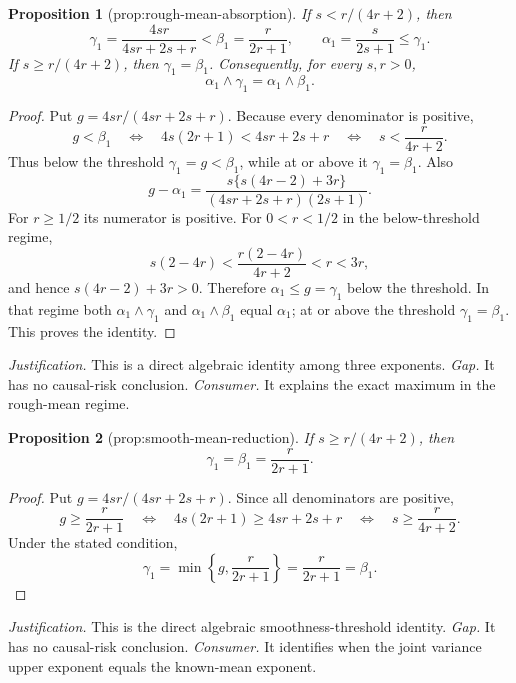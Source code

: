 \documentclass{article}
\newtheorem{proposition}{Proposition}
\begin{document}
\begin{proposition}[prop:rough-mean-absorption]\label{prop:rough-mean-absorption}
If \(s<r/(4r+2)\), then
\[
\gamma_1=\frac{4sr}{4sr+2s+r}<\beta_1=\frac{r}{2r+1},
\qquad
\alpha_1=\frac{s}{2s+1}\leq\gamma_1.
\]
If \(s\geq r/(4r+2)\), then \(\gamma_1=\beta_1\).  Consequently, for every \(s,r>0\),
\[
\alpha_1\wedge\gamma_1=\alpha_1\wedge\beta_1.
\]
\end{proposition}
\begin{proof}
Put \(g=4sr/(4sr+2s+r)\).  Because every denominator is positive,
\[
g<\beta_1
\quad\Longleftrightarrow\quad
4s(2r+1)<4sr+2s+r
\quad\Longleftrightarrow\quad
s<\frac{r}{4r+2}.
\]
Thus below the threshold \(\gamma_1=g<\beta_1\), while at or above it \(\gamma_1=\beta_1\).  Also
\[
g-\alpha_1
=\frac{s\{s(4r-2)+3r\}}
{(4sr+2s+r)(2s+1)}.
\]
For \(r\geq1/2\) its numerator is positive.  For \(0<r<1/2\) in the below-threshold regime,
\[
s(2-4r)<\frac{r(2-4r)}{4r+2}<r<3r,
\]
and hence \(s(4r-2)+3r>0\).  Therefore \(\alpha_1\leq g=\gamma_1\) below the threshold.  In that regime both \(\alpha_1\wedge\gamma_1\) and \(\alpha_1\wedge\beta_1\) equal \(\alpha_1\); at or above the threshold \(\gamma_1=\beta_1\).  This proves the identity.
\end{proof}
\par\smallskip\noindent \textit{Justification.} This is a direct algebraic identity among three exponents. \textit{Gap.} It has no causal-risk conclusion. \textit{Consumer.} It explains the exact maximum in the rough-mean regime.

\begin{proposition}[prop:smooth-mean-reduction]\label{prop:smooth-mean-reduction}
If \(s\geq r/(4r+2)\), then
\[
\gamma_1=\beta_1=\frac{r}{2r+1}.
\]
\end{proposition}
\begin{proof}
Put \(g=4sr/(4sr+2s+r)\).  Since all denominators are positive,
\[
g\geq\frac{r}{2r+1}
\quad\Longleftrightarrow\quad
4s(2r+1)\geq4sr+2s+r
\quad\Longleftrightarrow\quad
s\geq\frac{r}{4r+2}.
\]
Under the stated condition,
\[
\gamma_1=\min\left\{g,\frac{r}{2r+1}\right\}
=\frac{r}{2r+1}=\beta_1.
\]
\end{proof}
\par\smallskip\noindent \textit{Justification.} This is the direct algebraic smoothness-threshold identity. \textit{Gap.} It has no causal-risk conclusion. \textit{Consumer.} It identifies when the joint variance upper exponent equals the known-mean exponent.
\end{document}
